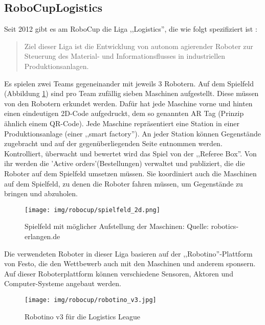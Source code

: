 \subsection{RoboCupLogistics}
Seit 2012 gibt es am RoboCup die Liga ,,Logistics'', die wie folgt spezifiziert ist \cite{wikipedia-robocup}:
\begin{quote}
	Ziel dieser Liga ist die Entwicklung von autonom agierender Roboter zur Steuerung des Material- und Informationsflusses in industriellen Produktionsanlagen.
\end{quote}
Es spielen zwei Teams gegeneinander mit jeweils 3 Robotern. Auf dem  Spielfeld (Abbildung \ref{fig:robocup_spielfeld}) sind pro Team zufällig sieben Maschinen  aufgestellt. Diese müssen von den Robotern erkundet werden. Dafür hat jede Maschine vorne und hinten einen eindeutigen 2D-Code aufgedruckt, dem so genannten AR Tag (Prinzip ähnlich einem QR-Code). Jede Maschine repräsentiert eine Station in einer Produktionsanlage (einer ,,smart factory''). An jeder Station können Gegenstände zugebracht und auf der gegenüberliegenden Seite entnommen werden. Kontrolliert, überwacht und bewertet wird das Spiel von der ,,Referee Box''. Von ihr werden die 'Active orders'(Bestellungen) verwaltet und publiziert, die die Roboter auf dem Spielfeld umsetzen müssen. Sie koordiniert auch die Maschinen auf dem Spielfeld, zu denen die Roboter fahren müssen, um Gegenstände zu bringen und abzuholen.
\begin{figure}[H]
	\centering
	\texttt{[image: img/robocup/spielfeld\_2d.png]}
	\caption{Spielfeld mit möglicher Aufstellung der Maschinen: Quelle: robotics-erlangen.de \cite{robotics-erlangen.de}}
	\label{fig:robocup_spielfeld}
\end{figure}

Die verwendeten Roboter in dieser Liga basieren auf der ,,Robotino''-Plattform  von Festo, die den Wettbewerb auch mit den Maschinen und anderem sponsern. Auf dieser Roboterplattform können verschiedene Sensoren, Aktoren und Computer-Systeme angebaut werden. 
\begin{figure}[H]
	\centering
	\texttt{[image: img/robocup/robotino\_v3.jpg]}
	\caption{Robotino v3 für die Logistics League\cite{robotino}}
	\label{fig:robotino}
\end{figure}

